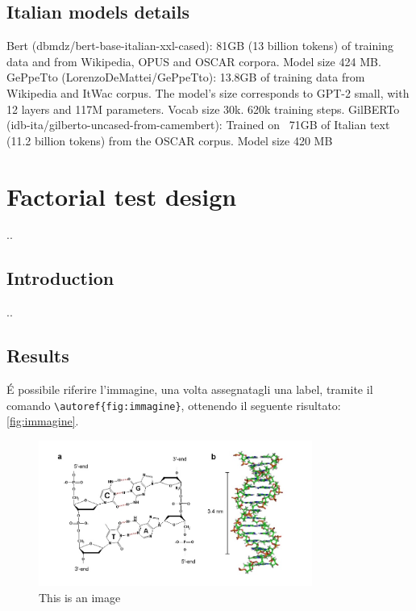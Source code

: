 \subsection{Italian models details}

Bert (dbmdz/bert-base-italian-xxl-cased): 81GB (13 billion tokens) of training data  and from Wikipedia, OPUS and OSCAR corpora. Model size 424 MB.
GePpeTto (LorenzoDeMattei/GePpeTto): 13.8GB of training data from Wikipedia and ItWac corpus. The model’s size corresponds to GPT-2 small, with 12 layers and 117M parameters. Vocab size 30k. 620k training steps.
GilBERTo (idb-ita/gilberto-uncased-from-camembert): Trained on ~71GB of Italian text (11.2 billion tokens) from the OSCAR corpus. Model size 420 MB


\section{Factorial test design}

..

\subsection{Introduction}

..

\subsection{Results}


É possibile riferire l'immagine, una volta assegnatagli una label, tramite il comando \texttt{\textbackslash autoref\{fig:immagine\}}, ottenendo il seguente risultato: \autoref{fig:immagine}.

\begin{figure}
	\centering
	\includegraphics[width=0.8\textwidth]{images/Chapter1/immagine.jpg} %
	\caption{This is an image} 
	\label{fig:immagine} %
\end{figure}


